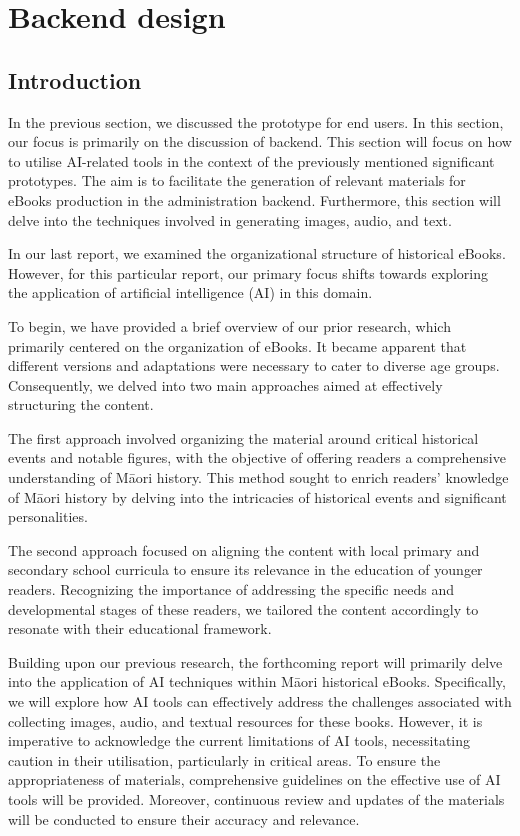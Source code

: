 \chapter{Backend design} 

\section{Introduction}
In the previous section, we discussed the prototype for end users. 
In this section, our focus is primarily on the discussion of backend.
This section will focus on how to utilise AI-related tools in the context of the previously mentioned significant prototypes. 
The aim is to facilitate the generation of relevant materials for eBooks production in the administration backend. 
Furthermore, this section will delve into the techniques involved in generating images, audio, and text.

In our last report, we examined the organizational structure of historical  eBooks. 
However, for this particular report, our primary focus shifts towards exploring the application of artificial intelligence (AI) in this domain.

To begin, we have provided a brief overview of our prior research, which primarily centered on the organization of  eBooks. 
It became apparent that different versions and adaptations were necessary to cater to diverse age groups. 
Consequently, we delved into two main approaches aimed at effectively structuring the content.

The first approach involved organizing the material around critical historical events and notable figures, with the objective of offering readers a comprehensive understanding of Māori history. 
This method sought to enrich readers' knowledge of Māori history by delving into the intricacies of historical events and significant personalities.

The second approach focused on aligning the content with local primary and secondary school curricula to ensure its relevance in the education of younger readers. 
Recognizing the importance of addressing the specific needs and developmental stages of these readers, we tailored the content accordingly to resonate with their educational framework.

Building upon our previous research, the forthcoming report will primarily delve into the application of AI techniques within Māori historical  eBooks. 
Specifically, we will explore how AI tools can effectively address the challenges associated with collecting images, audio, and textual resources for these books. 
However, it is imperative to acknowledge the current limitations of AI tools, necessitating caution in their utilisation, particularly in critical areas. 
To ensure the appropriateness of materials, comprehensive guidelines on the effective use of AI tools will be provided. 
Moreover, continuous review and updates of the materials will be conducted to ensure their accuracy and relevance.

